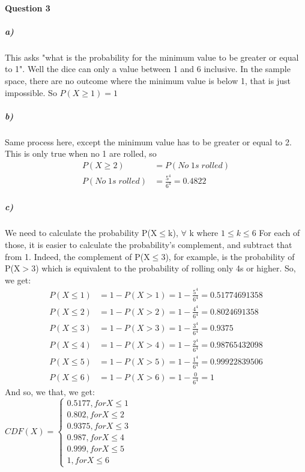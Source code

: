 \documentclass{article}
\begin{document}
\paragraph{Question 3}
\subparagraph{a)}
This asks "what is the probability for the minimum value to be greater or equal to 1". Well the dice can only a value between 1 and 6 inclusive. In the sample space, there are no outcome where the minimum value is below 1, that is just impossible. So $P(X\geq1) = 1$
\subparagraph{b)}
Same process here, except the minimum value has to be greater or equal to 2. This is only true when no 1 are rolled, so 
\begin{equation*}
\begin{split}
P(X\geq2) & = P(No\;1s\;rolled) \\
P(No\;1s\;rolled) & = \frac{5^4}{6^4} = 0.4822
\end{split}
\end{equation*}
\subparagraph{c)}
We need to calculate the probability P(X$\leq$k), $\forall$ k where $1\leq k\leq 6$
For each of those, it is easier to calculate the probability's complement, and subtract that from 1.
Indeed, the complement of P(X$\leq$3), for example, is the probability of P(X$>$3) which is equivalent to the probability of rolling only 4s or higher. So, we get: \\
\begin{equation*}
\begin{split}
P(X\leq1) & = 1 - P(X>1)  = 1 - \frac{5^4}{6^4}  = 0.51774691358 \\
P(X\leq2) & = 1 - P(X>2)  = 1 - \frac{4^4}{6^4}  = 0.8024691358 \\
P(X\leq3) & = 1 - P(X>3)  = 1 - \frac{3^4}{6^4} = 0.9375 \\
P(X\leq4) & = 1 - P(X>4)  = 1 - \frac{2^4}{6^4}  = 0.98765432098 \\
P(X\leq5) & = 1 - P(X>5)  = 1 - \frac{1^4}{6^4} = 0.99922839506 \\
P(X\leq6) & = 1 - P(X>6)  = 1 - \frac{0}{6^4}  = 1 
\end{split}
\end{equation*}
And so, we that, we get: \\
$
CDF(X) = \begin{cases} 0.5177, for X\leq 1 \\ 0.802, for X\leq 2 \\ 0.9375, for X\leq 3\\ 0.987, for X\leq 4\\ 0.999, for X\leq 5\\ 1, for X\leq 6\end{cases}
$
\end{document}
